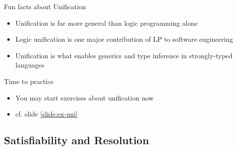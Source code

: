 \documentclass[presentation]{beamer}\mode<presentation>{\usetheme{AMSBolognaFC}}
\begin{document}
\begin{frame}{Fun facts about Unification}
    \begin{itemize}
        \item Unification is far more general than logic programming alone
        
        \vfill

        \item Logic unification is one major contribution of LP to \alert{software engineering}
        
        \vfill

        \item Unification is what enables \alert{generics} and \alert{type inference} in strongly-typed languages
    \end{itemize}
\end{frame}

\begin{frame}
    \begin{block}{Time to practice}
        \begin{itemize}
            \item You may start exercises about \alert{unification} now
            \item cf. slide \ref{slide:ex-uni}
        \end{itemize}
    \end{block}
\end{frame}

\subsection{Satisfiability and Resolution}
\end{document}
